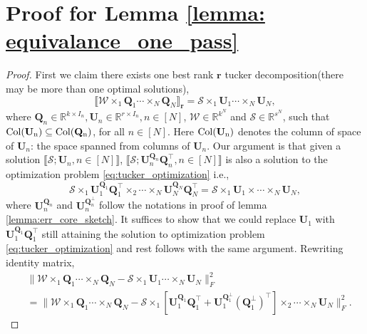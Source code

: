 \section{Proof for Lemma \ref{lemma: equivalance_one_pass}}
\begin{proof} 
First we claim there exists one best rank $\mathbf{r}$ tucker decomposition(there may be more than one optimal solutions),
\begin{equation}
 \llbracket \mathscr{W}\times_1 \mathbf{Q}_1 \cdots \times_N \mathbf{Q}_N \rrbracket_\mathbf{r} = \mathscr{S} \times_1 \mathbf{U}_1 \cdots \times_N \mathbf{U}_N,
\end{equation}
where $\mathbf{Q}_n \in \mathbb{R}^{k\times I_n}, \mathbf{U}_n \in \mathbb{R}^{r\times I_n}, n\in [N]$, $\mathscr{W}\in \mathbb{R}^{k^N}$ and $\mathscr{S}\in \mathbb{R}^{s^N}$, such that $\rm{Col}(\mathbf{U}_n) \subseteq \rm{Col}(\mathbf{Q}_n)$, for all $n \in [N]$. Here $\rm{Col}(\mathbf{U}_n)$ denotes the column of space of $\mathbf{U}_n$: the space spanned from columns of $\mathbf{U}_n$. Our argument is that given a solution $\llbracket \mathscr{S}; \mathbf{U}_n, n\in [N]\rrbracket$, $\llbracket \mathscr{S}; \mathbf{U}_n^{\mathbf{Q}_n}\mathbf{Q}_n^\top, n\in [N]\rrbracket$  is also a solution to the optimization problem \eqref{eq:tucker_optimization} i.e., 
\begin{equation}
\mathscr{S} \times_1 \mathbf{U}_1^{\mathbf{Q}_1}\mathbf{Q}_1^\top\times_2 \cdots \times_N \mathbf{U}_N^{\mathbf{Q}_N}\mathbf{Q}_N^\top = \mathscr{S} \times_1 \mathbf{U}_1\times \cdots \times_N \mathbf{U}_N, 
\end{equation}
where $\mathbf{U}_n^{\mathbf{Q}_n}$ and $\mathbf{U}_n^{\mathbf{Q}^\bot_n}$ follow the notations in proof of lemma \ref{lemma:err_core_sketch}.
It suffices to show that we could replace $\mathbf{U}_1$ with
$\mathbf{U}_1^{\mathbf{Q}_1}\mathbf{Q}_1^\top$ still attaining the solution to optimization problem \eqref{eq:tucker_optimization} and rest follows with the same argument. Rewriting identity matrix, 
\begin{equation}
\begin{aligned}
&\|\mathscr{W}\times_1 \mathbf{Q}_1 \cdots \times_N \mathbf{Q}_N - \mathscr{S} \times_1 \mathbf{U}_1 \cdots \times_N \mathbf{U}_N\|_F^2 \\
& = \|\mathscr{W}\times_1 \mathbf{Q}_1 \cdots \times_N \mathbf{Q}_N - \mathscr{S} \times_1[ \mathbf{U}_1^{\mathbf{Q}_1}\mathbf{Q}_1^\top+\mathbf{U}_1^{\mathbf{Q}^\bot_1}(\mathbf{Q}^\bot_1)^\top  ]\times_2\cdots \times_N \mathbf{U}_N\|_F^2.
\end{aligned}

\end{equation}
\end{proof}
